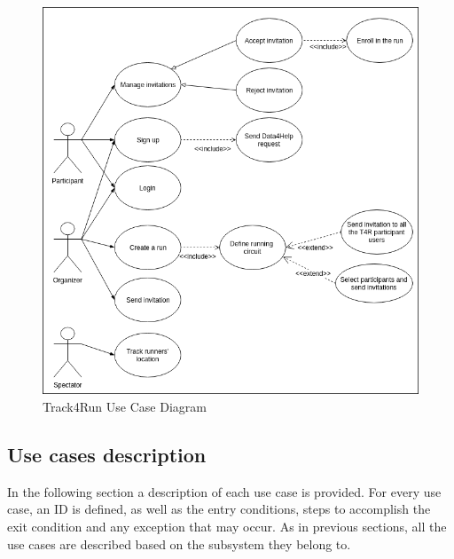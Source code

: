 \documentclass[a4paper, hidelinks, 12pt]{report}
\begin{document}
\begin{itemize}
		\begin{figure}[H]
			\centering
			\includegraphics[scale=0.6]{Diagrams/t4r_use_cases.png}
			\caption[Track4Run Use Case Diagram]{Track4Run Use Case Diagram}
			\label{fig:t4r_use_cases}
		\end{figure}
	\end{itemize}
	
	\subsection{Use cases description}
	In the following section a description of each use case is provided. For every use case, an ID is defined, as well as the entry conditions, steps to accomplish the exit condition and any exception that may occur. As in previous sections, all the use cases are described based on the subsystem they belong to.
	
\end{document}
